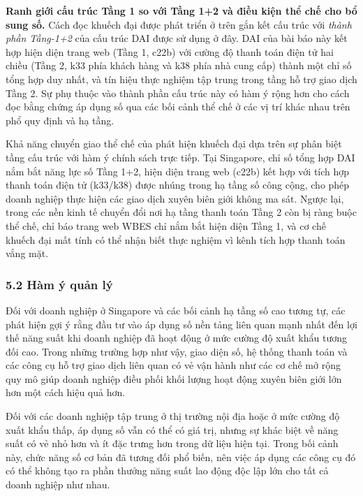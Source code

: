 \documentclass[12pt,a4paper]{article}
\begin{document}
\textbf{Ranh giới cấu trúc Tầng 1 so với Tầng 1+2 và điều kiện thể chế
cho bổ sung số.} Cách đọc khuếch đại được phát triển ở trên gắn kết cấu
trúc với \emph{thành phần Tầng-1+2} của cấu trúc DAI được sử dụng ở đây.
DAI của bài báo này kết hợp hiện diện trang web (Tầng 1, c22b) với cường
độ thanh toán điện tử hai chiều (Tầng 2, k33 phía khách hàng và k38 phía
nhà cung cấp) thành một chỉ số tổng hợp duy nhất, và tín hiệu thực
nghiệm tập trung trong tầng hỗ trợ giao dịch Tầng 2. Sự phụ thuộc vào
thành phần cấu trúc này có hàm ý rộng hơn cho cách đọc bằng chứng áp
dụng số qua các bối cảnh thể chế ở các vị trí khác nhau trên phổ quy
định và hạ tầng.

Khả năng chuyển giao thể chế của phát hiện khuếch đại dựa trên sự phân
biệt tầng cấu trúc với hàm ý chính sách trực tiếp. Tại Singapore, chỉ số
tổng hợp DAI nắm bắt năng lực số Tầng 1+2, hiện diện trang web (c22b)
kết hợp với tích hợp thanh toán điện tử (k33/k38) được nhúng trong hạ
tầng số công cộng, cho phép doanh nghiệp thực hiện các giao dịch xuyên
biên giới không ma sát. Ngược lại, trong các nền kinh tế chuyển đổi nơi
hạ tầng thanh toán Tầng 2 còn bị ràng buộc thể chế, chỉ báo trang web
WBES chỉ nắm bắt hiện diện Tầng 1, và cơ chế khuếch đại mất tính có thể
nhận biết thực nghiệm vì kênh tích hợp thanh toán vắng mặt.

\hypertarget{52-huxe0m-uxfd-quux1ea3n-luxfd}{%
\subsubsection{5.2 Hàm ý quản lý}\label{52-huxe0m-uxfd-quux1ea3n-luxfd}}

Đối với doanh nghiệp ở Singapore và các bối cảnh hạ tầng số cao tương
tự, các phát hiện gợi ý rằng đầu tư vào áp dụng số nền tảng liên quan
mạnh nhất đến lợi thế năng suất khi doanh nghiệp đã hoạt động ở mức
cường độ xuất khẩu tương đối cao. Trong những trường hợp như vậy, giao
diện số, hệ thống thanh toán và các công cụ hỗ trợ giao dịch liên quan
có vẻ vận hành như các cơ chế mở rộng quy mô giúp doanh nghiệp điều phối
khối lượng hoạt động xuyên biên giới lớn hơn một cách hiệu quả hơn.

Đối với các doanh nghiệp tập trung ở thị trường nội địa hoặc ở mức cường
độ xuất khẩu thấp, áp dụng số vẫn có thể có giá trị, nhưng sự khác biệt
về năng suất có vẻ nhỏ hơn và ít đặc trưng hơn trong dữ liệu hiện tại.
Trong bối cảnh này, chức năng số cơ bản đã tương đối phổ biến, nên việc
áp dụng các công cụ đó có thể không tạo ra phần thưởng năng suất lao
động độc lập lớn cho tất cả doanh nghiệp như nhau.
\end{document}
